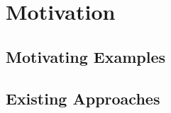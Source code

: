 \chapter{Motivation}\label{chap:metamodules-motivation}
\section{Motivating Examples}\label{sec:metamodules-motivating-examples}
\section{Existing Approaches}\label{sec:metamodules-existing-approaches}

